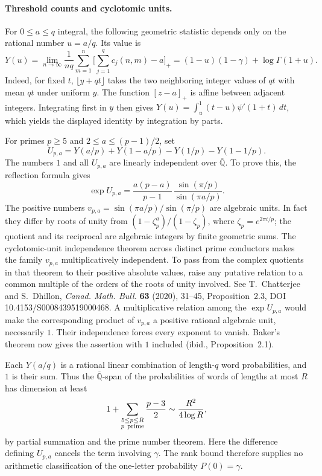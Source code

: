 \documentclass[11pt,a4paper,oneside,openany]{report}
\theoremstyle{remark}\newtheorem{remark}[theorem]{Remark}
\numberwithin{equation}{section}
\begin{document}
\paragraph{Threshold counts and cyclotomic units.}
For $0\le a\le q$ integral, the following geometric statistic depends
only on the rational number $u=a/q$. Its value is
\[
 Y(u)=\lim_{n\to\infty}\frac1{nq}\sum_{m=1}^n
 \bigg[\sum_{j=1}^q c_j(n,m)-a\bigg]_+
 =(1-u)(1-\gamma)+\log\Gamma(1+u).
\]
Indeed, for fixed $t$, $\lfloor y+qt\rfloor$ takes the two neighboring
integer values of $qt$ with mean $qt$ under uniform $y$. The function
$[z-a]_+$ is affine between adjacent integers. Integrating first in $y$
then gives $Y(u)=\int_u^1(t-u)\psi'(1+t)\,dt$, which yields the displayed
identity by integration by parts.

For primes $p\ge5$ and $2\le a\le(p-1)/2$, set
\[
 U_{p,a}=Y(a/p)+Y(1-a/p)-Y(1/p)-Y(1-1/p).
\]
The numbers $1$ and all $U_{p,a}$ are linearly independent over
$\overline{\mathbb Q}$. To prove this, the reflection formula gives
\[
 \exp U_{p,a}=\frac{a(p-a)}{p-1}\,
                 \frac{\sin(\pi/p)}{\sin(\pi a/p)}.
\]
The positive numbers $v_{p,a}=\sin(\pi a/p)/\sin(\pi/p)$ are algebraic
units. In fact they differ by roots of unity from
$(1-\zeta_p^a)/(1-\zeta_p)$, where $\zeta_p=e^{2\pi i/p}$; the quotient
and its reciprocal are algebraic integers by finite geometric sums.
The cyclotomic-unit independence theorem across distinct prime conductors
makes the family $v_{p,a}$ multiplicatively independent. To pass from
the complex quotients in that theorem to their positive absolute values,
raise any putative relation to a common multiple of the orders of the
roots of unity involved. See T.~Chatterjee and S.~Dhillon,
\emph{Canad. Math. Bull.} \textbf{63} (2020), 31--45, Proposition~2.3,
DOI 10.4153/S0008439519000468. A multiplicative relation among the
$\exp U_{p,a}$ would make the corresponding product of $v_{p,a}$ a
positive rational algebraic unit, necessarily $1$. Their independence
forces every exponent to vanish. Baker's theorem now gives the assertion
with $1$ included (ibid., Proposition~2.1).

Each $Y(a/q)$ is a rational linear combination of length-$q$ word
probabilities, and $1$ is their sum. Thus the $\overline{\mathbb Q}$-span
of the probabilities of words of lengths at most $R$ has dimension at least
\[
 1+\sum_{\substack{5\le p\le R\\p\ {\rm prime}}}\frac{p-3}{2}
 \sim\frac{R^2}{4\log R},
\]
by partial summation and the prime number theorem. Here the difference
defining $U_{p,a}$ cancels the term involving $\gamma$. The rank bound
therefore supplies no arithmetic classification of the one-letter
probability $P(0)=\gamma$.
\end{document}

